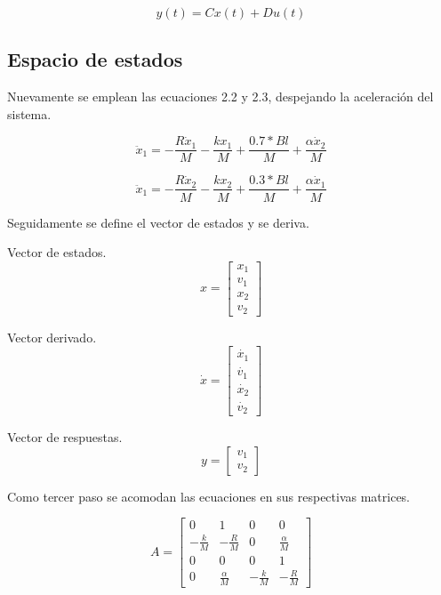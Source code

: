 \documentclass[journal]{IEEEtran}
\begin{document}
\begin{equation}
y(t) = Cx(t) + Du(t)
\end{equation}

\subsection{Espacio de estados}
Nuevamente se emplean las ecuaciones 2.2 y 2.3, despejando la aceleración del sistema.

\begin{equation*}
    \ddot{x}_1 = -\frac{R\dot{x}_1}{M}  -\frac{kx_1}{M} + \frac{0.7*Bl}{M} +  \frac{\alpha \dot{x}_2}{M}
\end{equation*}

\begin{equation*}
   \ddot{x}_1 = -\frac{R\dot{x}_2}{M}  -\frac{kx_2}{M} + \frac{0.3*Bl}{M} +  \frac{\alpha \dot{x}_1}{M}
\end{equation*}

Seguidamente se define el vector de estados y se deriva.

Vector de estados.
\begin{equation*}
x=\begin{bmatrix} x_1  \\  v_1  \\ x_2  \\ v_2 \end{bmatrix} 
\end{equation*}

Vector derivado.
\begin{equation*}
\dot{x}=\begin{bmatrix} \dot{x_1}  \\  \dot{v_1}  \\ \dot{x_2}  \\ \dot{v_2} \end{bmatrix} 
\end{equation*}

Vector de respuestas.
\begin{equation*}
y=\begin{bmatrix} v_1 \\ v_2 \end{bmatrix} 
\end{equation*}


Como tercer paso se acomodan las ecuaciones en sus respectivas matrices.


\begin{equation*}
A=\begin{bmatrix} 0 & 1 & 0 & 0 \\ -\frac{k}{M} & -\frac{R}{M}& 0 & \frac{\alpha}{M} \\ 0 & 0 & 0 & 1 \\ 0 & \frac{\alpha}{M} & -\frac{k}{M}& -\frac{R}{M}  \end{bmatrix}
\end{equation*}
\end{document}
